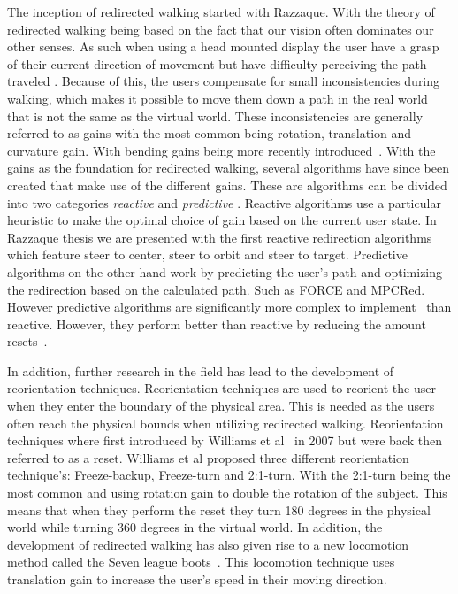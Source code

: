 \noindent
The inception of redirected walking started with Razzaque\cite{razzaque2005redirected}. With the theory of redirected walking being based on the fact that our vision often dominates our other senses. As such when using a head mounted display the user have a grasp of their current direction of movement but have difficulty perceiving the path traveled \cite{bertin2000perception}. Because of this, the users compensate for small inconsistencies during walking, which makes it possible to move them down a path in the real world that is not the same as the virtual world. These inconsistencies are generally referred to as gains with the most common being rotation, translation and curvature gain. With bending gains being more recently introduced~\cite{langbehn2017bending}. With the gains as the foundation for redirected walking, several algorithms have since been created that make use of the different gains. These are algorithms can be divided into two categories \textit{reactive} and \textit{predictive} \cite{azmandian2016redirected}. Reactive algorithms use a particular heuristic to make the optimal choice of gain based on the current user state. In Razzaque thesis\cite{razzaque2005redirected} we are presented with the first reactive redirection algorithms which feature steer to center, steer to orbit and steer to target. Predictive algorithms on the other hand work by predicting the user's path and optimizing the redirection based on the calculated path. Such as FORCE\cite{zmuda2013optimizing} and MPCRed\cite{nescher2014planning}. However predictive algorithms are significantly more complex to implement~\cite{azmandian2016redirected} than reactive. However, they perform better than reactive by reducing the amount resets~\cite{azmandian2016redirected}. %
\bigskip

\noindent
In addition, further research in the field has lead to the development of reorientation techniques. Reorientation techniques are used to reorient the user when they enter the boundary of the physical area. This is needed as the users often reach the physical bounds when utilizing redirected walking. Reorientation techniques where first introduced by Williams et al~\cite{williams2007exploring} in 2007 but were back then referred to as a reset. Williams et al proposed three different reorientation technique's: Freeze-backup, Freeze-turn and 2:1-turn. With the 2:1-turn being the most common and using rotation gain to double the rotation of the subject. This means that when they perform the reset they turn 180 degrees in the physical world while turning 360 degrees in the virtual world. In addition, the development of redirected walking has also given rise to a new locomotion method called the Seven league boots~\cite{interrante2007seven}. This locomotion technique uses translation gain to increase the user's speed in their moving direction.

